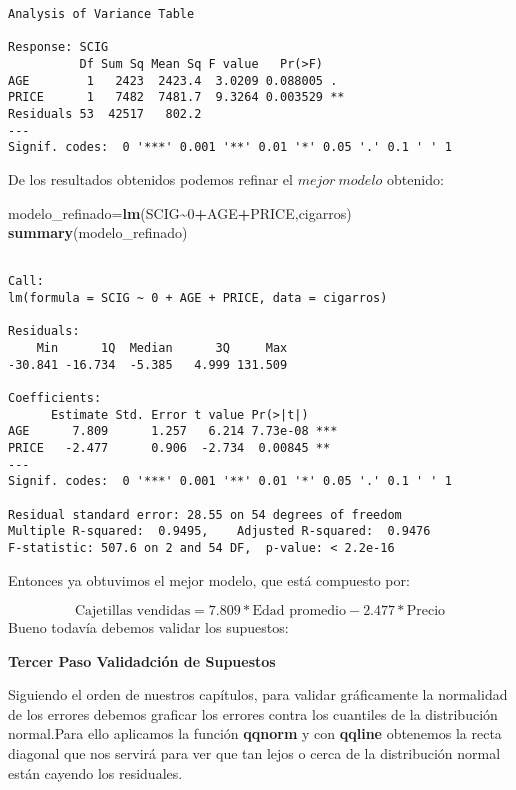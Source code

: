 \documentclass[
  a4paper,
  oneside,
  openany]{book}
\newenvironment{Shaded}{\begin{snugshade}}{\end{snugshade}}
\newcommand{\DecValTok}[1]{\textcolor[rgb]{0.00,0.00,0.81}{#1}}
\newcommand{\FunctionTok}[1]{\textcolor[rgb]{0.13,0.29,0.53}{\textbf{#1}}}
\newcommand{\NormalTok}[1]{#1}
\newcommand{\OtherTok}[1]{\textcolor[rgb]{0.56,0.35,0.01}{#1}}
\newcommand{\SpecialCharTok}[1]{\textcolor[rgb]{0.81,0.36,0.00}{\textbf{#1}}}
\begin{document}
\begin{verbatim}
Analysis of Variance Table

Response: SCIG
          Df Sum Sq Mean Sq F value   Pr(>F)   
AGE        1   2423  2423.4  3.0209 0.088005 . 
PRICE      1   7482  7481.7  9.3264 0.003529 **
Residuals 53  42517   802.2                    
---
Signif. codes:  0 '***' 0.001 '**' 0.01 '*' 0.05 '.' 0.1 ' ' 1
\end{verbatim}

De los resultados obtenidos podemos refinar el \(mejor \ modelo\) obtenido:

\begin{Shaded}
\begin{Highlighting}[]
\NormalTok{modelo\_refinado}\OtherTok{=}\FunctionTok{lm}\NormalTok{(SCIG}\SpecialCharTok{\textasciitilde{}}\DecValTok{0}\SpecialCharTok{+}\NormalTok{AGE}\SpecialCharTok{+}\NormalTok{PRICE,cigarros)}
\FunctionTok{summary}\NormalTok{(modelo\_refinado)}
\end{Highlighting}
\end{Shaded}

\begin{verbatim}

Call:
lm(formula = SCIG ~ 0 + AGE + PRICE, data = cigarros)

Residuals:
    Min      1Q  Median      3Q     Max 
-30.841 -16.734  -5.385   4.999 131.509 

Coefficients:
      Estimate Std. Error t value Pr(>|t|)    
AGE      7.809      1.257   6.214 7.73e-08 ***
PRICE   -2.477      0.906  -2.734  0.00845 ** 
---
Signif. codes:  0 '***' 0.001 '**' 0.01 '*' 0.05 '.' 0.1 ' ' 1

Residual standard error: 28.55 on 54 degrees of freedom
Multiple R-squared:  0.9495,    Adjusted R-squared:  0.9476 
F-statistic: 507.6 on 2 and 54 DF,  p-value: < 2.2e-16
\end{verbatim}

Entonces ya obtuvimos el mejor modelo, que está compuesto por:

\[\mbox{Cajetillas vendidas}= 7.809*\mbox{Edad promedio}-2.477*\mbox{Precio}\]
Bueno todavía debemos validar los supuestos:

\textbf{Tercer Paso Validadción de Supuestos}

Siguiendo el orden de nuestros capítulos, para validar gráficamente la normalidad de los errores debemos graficar los errores contra los cuantiles de la distribución normal.Para ello aplicamos la función \textbf{qqnorm} y con \textbf{qqline} obtenemos la recta diagonal que nos servirá para ver que tan lejos o cerca de la distribución normal están cayendo los residuales.
\end{document}
